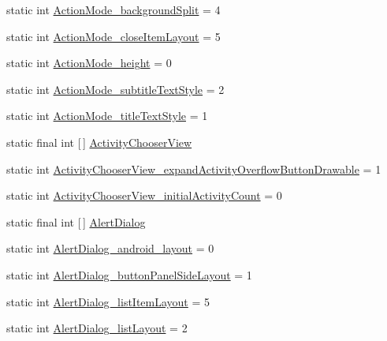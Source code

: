 \begin{DoxyCompactItemize}
\item 
static int \hyperlink{classandroid_1_1support_1_1v7_1_1cardview_1_1R_1_1styleable_a1ff81fea394e8d3fc2d0bac1f401a6b3}{Action\+Mode\+\_\+background\+Split} = 4
\item 
static int \hyperlink{classandroid_1_1support_1_1v7_1_1cardview_1_1R_1_1styleable_ad542200fde77c9d47f12726ea555d1ae}{Action\+Mode\+\_\+close\+Item\+Layout} = 5
\item 
static int \hyperlink{classandroid_1_1support_1_1v7_1_1cardview_1_1R_1_1styleable_a5e1ce0fbbed4e137f757b2513a06826c}{Action\+Mode\+\_\+height} = 0
\item 
static int \hyperlink{classandroid_1_1support_1_1v7_1_1cardview_1_1R_1_1styleable_a4e31cf5933cdeb00f2f52de225b74ceb}{Action\+Mode\+\_\+subtitle\+Text\+Style} = 2
\item 
static int \hyperlink{classandroid_1_1support_1_1v7_1_1cardview_1_1R_1_1styleable_a92d5caac9795b056f4da8a56c8588ee3}{Action\+Mode\+\_\+title\+Text\+Style} = 1
\item 
static final int \mbox{[}$\,$\mbox{]} \hyperlink{classandroid_1_1support_1_1v7_1_1cardview_1_1R_1_1styleable_a97ba41af4dd02474df8be813e34fb7ac}{Activity\+Chooser\+View}
\item 
static int \hyperlink{classandroid_1_1support_1_1v7_1_1cardview_1_1R_1_1styleable_ae76866cabdcba66de1df2213070ad829}{Activity\+Chooser\+View\+\_\+expand\+Activity\+Overflow\+Button\+Drawable} = 1
\item 
static int \hyperlink{classandroid_1_1support_1_1v7_1_1cardview_1_1R_1_1styleable_a3cf4fe79fcc5864408ce4243825dbbb8}{Activity\+Chooser\+View\+\_\+initial\+Activity\+Count} = 0
\item 
static final int \mbox{[}$\,$\mbox{]} \hyperlink{classandroid_1_1support_1_1v7_1_1cardview_1_1R_1_1styleable_a44fc620801e3af4c8b4e7ef1fee84a2d}{Alert\+Dialog}
\item 
static int \hyperlink{classandroid_1_1support_1_1v7_1_1cardview_1_1R_1_1styleable_a46ba2383ccdc3162ba8188ffa37a1070}{Alert\+Dialog\+\_\+android\+\_\+layout} = 0
\item 
static int \hyperlink{classandroid_1_1support_1_1v7_1_1cardview_1_1R_1_1styleable_a4ec06892d36ab96c77fe88a60ac4ad6d}{Alert\+Dialog\+\_\+button\+Panel\+Side\+Layout} = 1
\item 
static int \hyperlink{classandroid_1_1support_1_1v7_1_1cardview_1_1R_1_1styleable_a137cea4ff1985f8adf66f24c04789f6b}{Alert\+Dialog\+\_\+list\+Item\+Layout} = 5
\item 
static int \hyperlink{classandroid_1_1support_1_1v7_1_1cardview_1_1R_1_1styleable_a2c444e3b02b30ceb07374196ddb5a9dd}{Alert\+Dialog\+\_\+list\+Layout} = 2

\end{DoxyCompactItemize}
